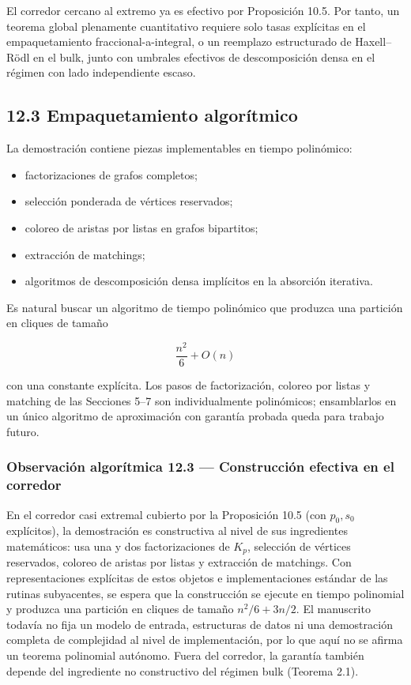 \documentclass[spanish,11pt,a4paper]{article}
\providecommand{\tightlist}{\setlength{\itemsep}{0pt}\setlength{\parskip}{0pt}}
\begin{document}
El corredor cercano al extremo ya es efectivo por Proposición 10.5. Por
tanto, un teorema global plenamente cuantitativo requiere solo tasas
explícitas en el empaquetamiento fraccional-a-integral, o un reemplazo
estructurado de Haxell--Rödl en el bulk, junto con umbrales efectivos de
descomposición densa en el régimen con lado independiente escaso.

\subsection{12.3 Empaquetamiento
algorítmico}\label{empaquetamiento-algoruxedtmico}

La demostración contiene piezas implementables en tiempo polinómico:

\begin{itemize}
\tightlist
\item
  factorizaciones de grafos completos;
\item
  selección ponderada de vértices reservados;
\item
  coloreo de aristas por listas en grafos bipartitos;
\item
  extracción de matchings;
\item
  algoritmos de descomposición densa implícitos en la absorción
  iterativa.
\end{itemize}

Es natural buscar un algoritmo de tiempo polinómico que produzca una
partición en cliques de tamaño

\[
\frac{n^2}{6}+O(n)
\]

con una constante explícita. Los pasos de factorización, coloreo por
listas y matching de las Secciones 5--7 son individualmente polinómicos;
ensamblarlos en un único algoritmo de aproximación con garantía probada
queda para trabajo futuro.

\subsubsection{Observación algorítmica 12.3 --- Construcción efectiva en
el
corredor}\label{observaciuxf3n-algoruxedtmica-12.3-construcciuxf3n-efectiva-en-el-corredor}

En el corredor casi extremal cubierto por la Proposición 10.5 (con
\(p_0,s_0\) explícitos), la demostración es constructiva al nivel de sus
ingredientes matemáticos: usa una y dos factorizaciones de \(K_p\),
selección de vértices reservados, coloreo de aristas por listas y
extracción de matchings. Con representaciones explícitas de estos
objetos e implementaciones estándar de las rutinas subyacentes, se
espera que la construcción se ejecute en tiempo polinomial y produzca
una partición en cliques de tamaño \(n^2/6+3n/2\). El manuscrito todavía
no fija un modelo de entrada, estructuras de datos ni una demostración
completa de complejidad al nivel de implementación, por lo que aquí no
se afirma un teorema polinomial autónomo. Fuera del corredor, la
garantía también depende del ingrediente no constructivo del régimen
bulk (Teorema 2.1).
\end{document}
